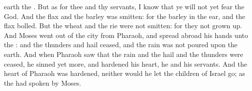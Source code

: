 {earth
{} the
{}.
But as for thee and thy
servants, I
know that ye will not yet
fear the
{}
God.
And the
flax and the
barley was
smitten: for the
barley
{} in the
ear, and the
flax
{}
bolled.
But the
wheat and the
rie were not
smitten: for
they
{} not grown
up.
And
Moses went
out of the
city from
Pharaoh, and spread
abroad his
hands unto the
{}: and the
thunders and
hail
ceased, and the
rain was not
poured upon the
earth.
And when
Pharaoh
saw that the
rain and the
hail and the
thunders were
ceased, he
sinned yet
more, and
hardened his
heart, he and his
servants.
And the
heart of
Pharaoh was
hardened, neither would he let the
children of
Israel
go; as the
{} had
spoken
by
Moses.

}
